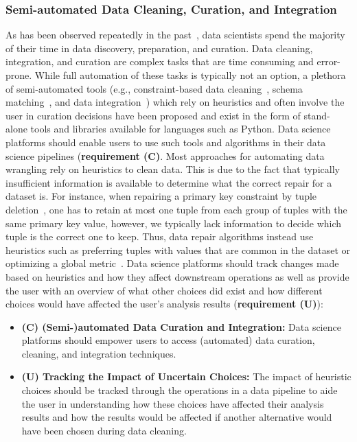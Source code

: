 \subsubsection{Semi-automated Data Cleaning, Curation, and Integration}
\label{sec:semi-automated-data}
%
As has been observed repeatedly in the past~\cite{nyt:wrangling}, data scientists spend the majority of their time in data discovery, preparation, and curation. Data cleaning, integration, and curation are complex tasks that are time consuming and error-prone. While full automation of these tasks is typically not an option, a plethora of semi-automated tools (e.g., constraint-based data cleaning~\cite{ilyas-15-tcrd}, schema matching~\cite{RB01}, and data integration~\cite{HR06}) which rely on heuristics and often involve the user in curation decisions have been proposed and exist in the form of stand-alone tools and libraries available for languages such as Python. Data science platforms should enable users to use such tools and algorithms in their data science pipelines (\textbf{requirement (C)}. Most approaches for automating data wrangling rely on heuristics to clean data. This is due to the fact that typically insufficient information is available to determine what the correct repair for a dataset is. For instance, when repairing a primary key constraint by tuple deletion~\cite{ilyas-15-tcrd}, one has to retain at most one tuple from each group of tuples with the same primary key value, however, we typically lack information to decide which tuple is the correct one to keep. Thus, data repair algorithms instead use heuristics such as preferring tuples with values that are common in the dataset or optimizing a global metric~\cite{RC17}. Data science platforms should track changes made based on heuristics and how they affect downstream operations as well as provide the user with an overview of what other choices did exist and how different choices would have affected the user's analysis results (\textbf{requirement (U)}):
\begin{itemize}
\item \textbf{(C) (Semi-)automated Data Curation and Integration:} Data science platforms should empower users to access (automated) data curation, cleaning, and integration techniques.
\item \textbf{(U) Tracking the Impact of Uncertain Choices:}  The impact of heuristic choices should be tracked through the operations in a data pipeline to aide the user in understanding how these choices have affected their analysis results and how the results would be affected if another alternative would have been chosen during data cleaning.
\end{itemize}

